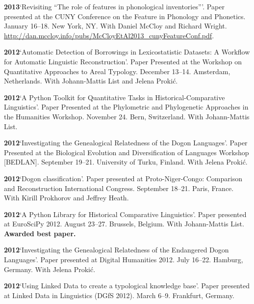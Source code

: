 \documentclass[11pt]{article}
\newcommand{\hangpara}{
 \setlength{\parindent}{0in} %
 \hangindent=0.42in %
}
\begin{document}
\vskip 6pt
\hangpara
{\bf 2013}\hspace{1ex}`Revisiting ``The role of features in phonological inventories'''. Paper presented at the CUNY Conference on the Feature in Phonology and Phonetics. January 16--18. New York, NY. With Daniel McCloy and Richard Wright. \url{http://dan.mccloy.info/pubs/McCloyEtAl2013_cunyFeatureConf.pdf}.

\vskip 6pt
\hangpara
{\bf 2012}\hspace{1ex}`Automatic Detection of Borrowings in Lexicostatistic Datasets: A Workflow for Automatic Linguistic Reconstruction'. Paper Presented at the Workshop on Quantitative Approaches to Areal Typology. December 13--14. Amsterdam, Netherlands. With Johann-Mattis List and Jelena Proki{\'c}.

\vskip 6pt
\hangpara
{\bf 2012}\hspace{1ex}`A Python Toolkit for Quantitative Tasks in Historical-Comparative Linguistics'. Paper Presented at the Phylometric and Phylogenetic Approaches in the Humanities Workshop. November 24. Bern, Switzerland. With Johann-Mattis List.

\vskip 6pt
\hangpara
{\bf 2012}\hspace{1ex}`Investigating the Genealogical Relatedness of the Dogon Languages'. Paper Presented at the Biological Evolution and Diversification of Languages Workshop [BEDLAN]. September 19--21. University of Turku, Finland. With Jelena Proki{\'c}.

\vskip 6pt
\hangpara
{\bf 2012}\hspace{1ex}`Dogon classification'. Paper presented at Proto-Niger-Congo: Comparison and Reconstruction International Congress. September 18--21. Paris, France. With Kirill Prokhorov and Jeffrey Heath.

\vskip 6pt
\hangpara
{\bf 2012}\hspace{1ex}`A Python Library for Historical Comparative Linguistics'. Paper presented at EuroSciPy 2012. August 23--27. Brussels, Belgium. With Johann-Mattis List. \textbf{Awarded best paper.}

\vskip 6pt
\hangpara
{\bf 2012}\hspace{1ex}`Investigating the Genealogical Relatedness of the Endangered Dogon Languages'. Paper presented at Digital Humanities 2012. July 16--22. Hamburg, Germany. With Jelena Proki{\'c}.

\vskip 6pt
\hangpara
{\bf 2012}\hspace{1ex}`Using Linked Data to create a typological knowledge base'. Paper presented at Linked Data in Linguistics (DGfS 2012). March 6--9. Frankfurt, Germany.
\end{document}
